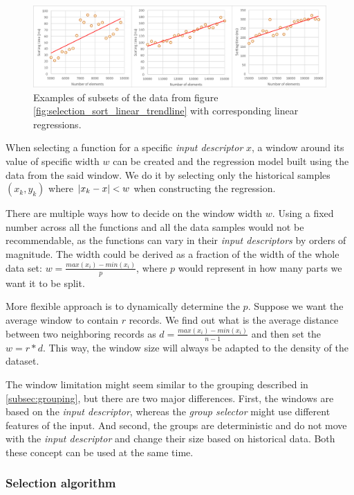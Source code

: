 \begin{figure}[h!]
	\captionsetup{justification=centering,margin=0.5cm}
	\centerline{\mbox{\includegraphics[width=150mm]{./img/window_examples.png}}}
	\caption{Examples of subsets of the data from figure \ref{fig:selection_sort_linear_trendline} with corresponding linear regressions.}
	\label{fig:window_examples}
\end{figure}

When selecting a function for a specific \textit{input descriptor} $x$, a window around its value of specific width $w$ can be created and the regression model built using the data from the said window. We do it by selecting only the historical samples $(x_k, y_k)$ where $\left|{x_k - x}\right| < w$ when constructing the regression.

There are multiple ways how to decide on the window width $w$. Using a fixed number across all the functions and all the data samples would not be recommendable, as the functions can vary in their \textit{input descriptors} by orders of magnitude. The width could be derived as a fraction of the width of the whole data set: $w = \frac{max(x_i) - min(x_i)}{p}$, where $p$ would represent in how many parts we want it to be split. 

More flexible approach is to dynamically determine the $p$. Suppose we want the average window to contain $r$ records. We find out what is the average distance between two neighboring records as $d =  \frac{max(x_i) - min(x_i)}{n - 1}$ and then set the $w = r * d$. This way, the window size will always be adapted to the density of the dataset.

The window limitation might seem similar to the grouping described in \ref{subsec:grouping}, but there are two major differences. First, the windows are based on the \textit{input descriptor}, whereas the \textit{group selector} might use different features of the input. And second, the groups are deterministic and do not move with the \textit{input descriptor} and change their size based on historical data. Both these concept can be used at the same time.

\subsubsection{Selection algorithm}

